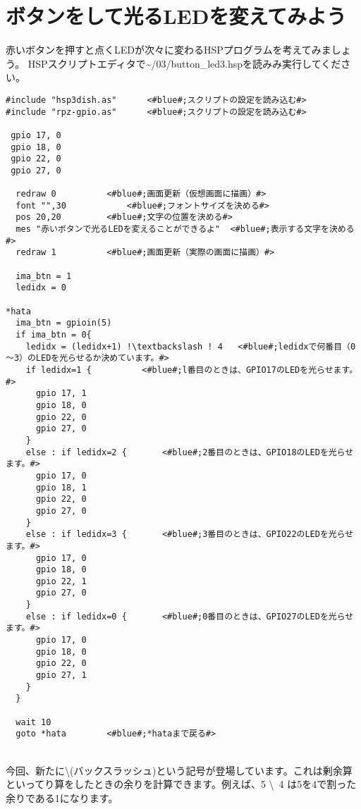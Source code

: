 \newpage
\section{ボタンをして光るLEDを変えてみよう}
赤いボタンを押すと点くLEDが次々に変わるHSPプログラムを考えてみましょう。
HSPスクリプトエディタで\textasciitilde/03/button\_led3.hspを読みみ実行してください。

\begin{lstlisting}[escapechar=!,caption=\textasciitilde/03/button\_led3.hsp,label=button_led3.hsp]
#include "hsp3dish.as"		<#blue#;スクリプトの設定を読み込む#>
#include "rpz-gpio.as"		<#blue#;スクリプトの設定を読み込む#>

 gpio 17, 0
 gpio 18, 0
 gpio 22, 0
 gpio 27, 0
	
  redraw 0			<#blue#;画面更新（仮想画面に描画）#>
  font "",30			<#blue#;フォントサイズを決める#>
  pos 20,20			<#blue#;文字の位置を決める#>
  mes "赤いボタンで光るLEDを変えることができるよ"	<#blue#;表示する文字を決める#>
  redraw 1			<#blue#;画面更新（実際の画面に描画）#>

  ima_btn = 1
  ledidx = 0

*hata
  ima_btn = gpioin(5)
  if ima_btn = 0{
    ledidx = (ledidx+1) !\textbackslash ! 4	  <#blue#;ledidxで何番目（0～3）のLEDを光らせるか決めています。#>
    if ledidx=1 {		   <#blue#;l番目のときは、GPIO17のLEDを光らせます。#>
      gpio 17, 1
      gpio 18, 0
      gpio 22, 0
      gpio 27, 0
    }
    else : if ledidx=2 {	   <#blue#;2番目のときは、GPIO18のLEDを光らせます。#>
      gpio 17, 0
      gpio 18, 1
      gpio 22, 0
      gpio 27, 0
    }
    else : if ledidx=3 {	   <#blue#;3番目のときは、GPIO22のLEDを光らせます。#>
      gpio 17, 0
      gpio 18, 0
      gpio 22, 1
      gpio 27, 0
    }
    else : if ledidx=0 {	   <#blue#;0番目のときは、GPIO27のLEDを光らせます。#>
      gpio 17, 0
      gpio 18, 0
      gpio 22, 0
      gpio 27, 1
    }
  }

  wait 10
  goto *hata		<#blue#;*hataまで戻る#>
\end{lstlisting}

\noindent \textbf{}\\
今回、新たに\textbackslash (バックスラッシュ)という記号が登場しています。これは剰余算といってり算をしたときの余りを計算できます。例えば、5 \textbackslash \ 4 は5を4で割った余りである1になります。


